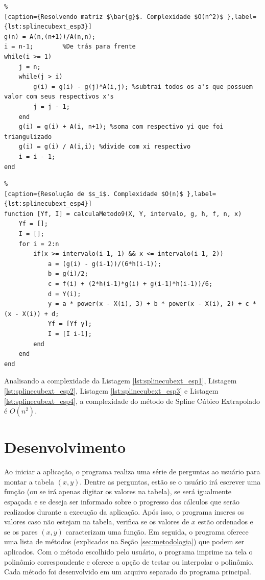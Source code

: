 \documentclass[conference]{IEEEtran}
\begin{document}
\begin{lstlisting}%
[caption={Resolvendo matriz $\bar{g}$. Complexidade $O(n^2)$ },label={lst:splinecubext_esp3}]
g(n) = A(n,(n+1))/A(n,n);
i = n-1;        %De trás para frente
while(i >= 1)
    j = n;
    while(j > i)
        g(i) = g(i) - g(j)*A(i,j); %subtrai todos os a's que possuem valor com seus respectivos x's
        j = j - 1;
    end
    g(i) = g(i) + A(i, n+1); %soma com respectivo yi que foi triangulizado
    g(i) = g(i) / A(i,i); %divide com xi respectivo
    i = i - 1;   
end
\end{lstlisting}

\begin{lstlisting}%
[caption={Resolução de $s_i$. Complexidade $O(n)$ },label={lst:splinecubext_esp4}]
function [Yf, I] = calculaMetodo9(X, Y, intervalo, g, h, f, n, x)
    Yf = [];
    I = [];
    for i = 2:n
        if(x >= intervalo(i-1, 1) && x <= intervalo(i-1, 2))
            a = (g(i) - g(i-1))/(6*h(i-1));
            b = g(i)/2;
            c = f(i) + (2*h(i-1)*g(i) + g(i-1)*h(i-1))/6;
            d = Y(i);
            y = a * power(x - X(i), 3) + b * power(x - X(i), 2) + c * (x - X(i)) + d;
            Yf = [Yf y];
            I = [I i-1];
        end
    end
end
\end{lstlisting}

Analisando a complexidade da Listagem \ref{lst:splinecubext_esp1}, Listagem \ref{lst:splinecubext_esp2}, Listagem \ref{lst:splinecubext_esp3} e Listagem \ref{lst:splinecubext_esp4}, a complexidade do método de Spline Cúbico Extrapolado é $O(n^2)$.
\section{Desenvolvimento}\label{sec:desenvolvimento}

Ao iniciar a aplicação, o programa realiza uma série de perguntas ao usuário para montar a tabela $(x,y)$. Dentre as perguntas, estão se o usuário irá escrever uma função (ou se irá apenas digitar os valores na tabela), se será igualmente espaçada e se deseja ser informado sobre o progresso dos cálculos que serão realizados durante a execução da aplicação. Após isso, o programa inseres os valores caso não estejam na tabela, verifica se os valores de $x$ estão ordenados e se os pares $(x,y)$ caracterizam uma função. Em seguida, o programa oferece uma lista de métodos (explicados na Seção \ref{sec:metodologia}) que podem ser aplicados. Com o método escolhido pelo usuário, o programa imprime na tela o polinômio correspondente e oferece a opção de testar ou interpolar o polinômio. Cada método foi desenvolvido em um arquivo separado do programa principal.
\end{document}
